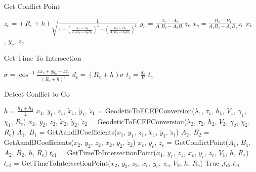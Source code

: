 \documentclass[11pt]{book}              %
\begin{document}
\begin{algorithm}[H]
\caption{Get Conflict Point}\label{alg:CDNRAlgo2}
\begin{algorithmic}[1]
\State $z_c = (R_e+h)\sqrt{\frac{1}{1+\left(\frac{A_1-A_2}{A_1B_2-A_2B_1}\right)^2+\left(\frac{B_2-B_1}{A_1B_2-A_2B_1}\right)^2 }}$
\State $y_c = \frac{A_1-A_2}{A_1B_2-A_2B_1}z_c$
\State $x_c = \frac{B_2-B_1}{A_1B_2-A_2B_1}z_c$
\State \Return $x_c$, $y_c$, $z_c$
\EndProcedure
\end{algorithmic}
\end{algorithm}

\begin{algorithm}[H]
\caption{Get Time To Intersection}\label{alg:CDNRAlgo3}
\begin{algorithmic}[1]
\State $\sigma = \cos^{-1}\frac{xx_c+yy_c+zz_c}{(R_e+h)^2}$
\State $d_c = (R_e+h)\sigma$
\State $t_c = \frac{d_c}{V}$
\State \Return $t_c$
\EndProcedure
\end{algorithmic}
\end{algorithm}

\begin{algorithm}[H]
\caption{Detect Conflict to Go}\label{alg:CDNRAlgo4}
\begin{algorithmic}[1]
\State $h = \frac{h_1+h_2}2$ 
\State $x_1$, $y_1$, $z_1$, $\dot{x}_1$, $\dot{y}_1$, $\dot{z}_1$ = GeodeticToECEFConversion($\lambda_1$, $\tau_1$, $h_1$, $V_1$, $\gamma_1$, $\chi_1$, $R_e$)
\State $x_2$, $y_2$, $z_2$, $\dot{x}_2$, $\dot{y}_2$, $\dot{z}_2$ = GeodeticToECEFConversion($\lambda_2$, $\tau_2$, $h_2$, $V_2$, $\gamma_2$, $\chi_2$, $R_e$)
\State $A_1$, $B_1$ = GetAandBCoefficients($x_1$, $y_1$, $z_1$, $\dot{x}_1$, $\dot{y}_1$, $\dot{z}_1$)
\State $A_2$, $B_2$ = GetAandBCoefficients($x_2$, $y_2$, $z_2$, $\dot{x}_2$, $\dot{y}_2$, $\dot{z}_2$)
\State $x_c$, $y_c$, $z_c$ = GetConflictPoint($A_1$, $B_1$, $A_2$, $B_2$, $h$, $R_e$)
\State $t_{c1}$ = GetTimeToIntersectionPoint($x_1$, $y_1$, $z_1$, $x_c$, $y_c$, $z_c$, $V_1$, $h$, $R_e$)
\State $t_{c2}$ = GetTimeToIntersectionPoint($x_2$, $y_2$, $z_2$, $x_c$, $y_c$, $z_c$, $V_2$, $h$, $R_e$)
\State \Return True ,$t_{c2}$,$t_{c1}$
\EndProcedure
\end{algorithmic}
\end{algorithm}
\end{document}
